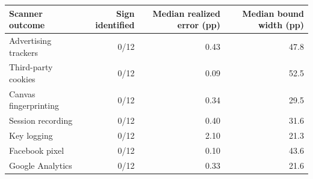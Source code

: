 \begin{tabular}{lrrr}
\toprule
Scanner outcome & Sign identified & Median realized error (pp) & Median bound width (pp) \\
\midrule
Advertising trackers & 0/12 & 0.43 & 47.8 \\
Third-party cookies & 0/12 & 0.09 & 52.5 \\
Canvas fingerprinting & 0/12 & 0.34 & 29.5 \\
Session recording & 0/12 & 0.40 & 31.6 \\
Key logging & 0/12 & 2.10 & 21.3 \\
Facebook pixel & 0/12 & 0.10 & 43.6 \\
Google Analytics & 0/12 & 0.33 & 21.6 \\
\bottomrule
\end{tabular}
